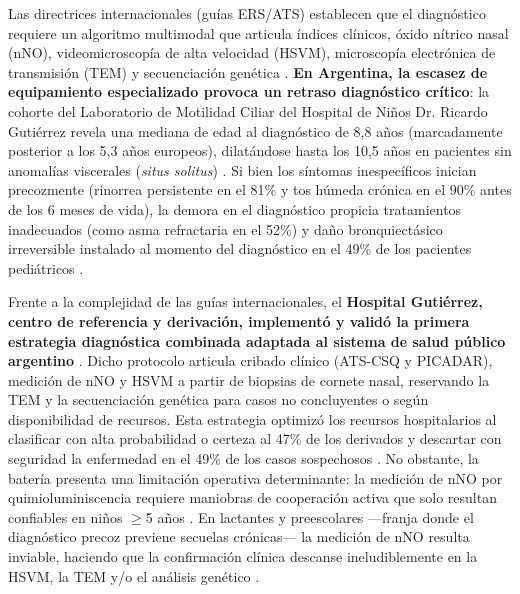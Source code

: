 \documentclass[11pt,letterpaper]{article}
\begin{document}
Las directrices internacionales (guías ERS/ATS) establecen que el diagnóstico requiere un algoritmo multimodal que articula índices clínicos, óxido nítrico nasal (nNO), videomicroscopía de alta velocidad (HSVM), microscopía electrónica de transmisión (TEM) y secuenciación genética \cite{Shapiro2015,Balinotti2026}. \textbf{En Argentina, la escasez de equipamiento especializado provoca un retraso diagnóstico crítico}: la cohorte del Laboratorio de Motilidad Ciliar del Hospital de Niños Dr. Ricardo Gutiérrez revela una mediana de edad al diagnóstico de 8,8 años (marcadamente posterior a los 5,3 años europeos), dilatándose hasta los 10,5 años en pacientes sin anomalías viscerales (\textit{situs solitus}) \cite{Collison2025,Balinotti2026}. Si bien los síntomas inespecíficos inician precozmente (rinorrea persistente en el 81\% y tos húmeda crónica en el 90\% antes de los 6 meses de vida), la demora en el diagnóstico propicia tratamientos inadecuados (como asma refractaria en el 52\%) y daño bronquiectásico irreversible instalado al momento del diagnóstico en el 49\% de los pacientes pediátricos \cite{ComiteNeumonologia2020,Balinotti2026}.

Frente a la complejidad de las guías internacionales, el \textbf{Hospital Gutiérrez, centro de referencia y derivación, implementó y validó la primera estrategia diagnóstica combinada adaptada al sistema de salud público argentino} \cite{Balinotti2026}. Dicho protocolo articula cribado clínico (ATS-CSQ y PICADAR), medición de nNO y HSVM a partir de biopsias de cornete nasal, reservando la TEM y la secuenciación genética para casos no concluyentes o según disponibilidad de recursos. Esta estrategia optimizó los recursos hospitalarios al clasificar con alta probabilidad o certeza al 47\% de los derivados y descartar con seguridad la enfermedad en el 49\% de los casos sospechosos \cite{Balinotti2026}. No obstante, la batería presenta una limitación operativa determinante: la medición de nNO por quimioluminiscencia requiere maniobras de cooperación activa que solo resultan confiables en niños $\ge$5 años \cite{Shapiro2015,Wrona2025,Balinotti2026}. En lactantes y preescolares ---franja donde el diagnóstico precoz previene secuelas crónicas--- la medición de nNO resulta inviable, haciendo que la confirmación clínica descanse ineludiblemente en la HSVM, la TEM y/o el análisis genético \cite{ComiteNeumonologia2020,Balinotti2026}.
\end{document}
